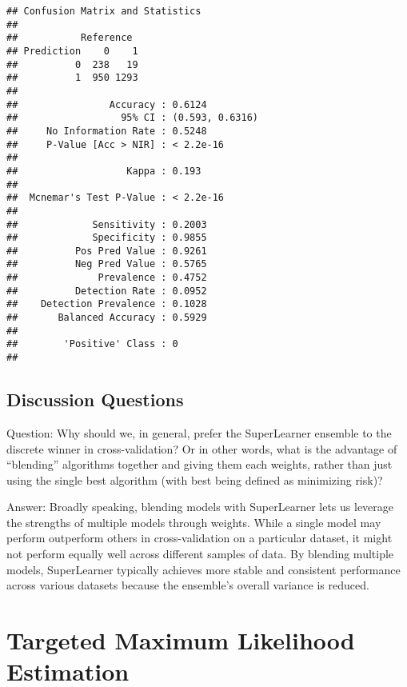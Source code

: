 \documentclass[
]{article}
\begin{document}
\begin{verbatim}
## Confusion Matrix and Statistics
## 
##           Reference
## Prediction    0    1
##          0  238   19
##          1  950 1293
##                                          
##                Accuracy : 0.6124         
##                  95% CI : (0.593, 0.6316)
##     No Information Rate : 0.5248         
##     P-Value [Acc > NIR] : < 2.2e-16      
##                                          
##                   Kappa : 0.193          
##                                          
##  Mcnemar's Test P-Value : < 2.2e-16      
##                                          
##             Sensitivity : 0.2003         
##             Specificity : 0.9855         
##          Pos Pred Value : 0.9261         
##          Neg Pred Value : 0.5765         
##              Prevalence : 0.4752         
##          Detection Rate : 0.0952         
##    Detection Prevalence : 0.1028         
##       Balanced Accuracy : 0.5929         
##                                          
##        'Positive' Class : 0              
## 
\end{verbatim}

\hypertarget{discussion-questions}{%
\subsection{Discussion Questions}\label{discussion-questions}}

Question: Why should we, in general, prefer the SuperLearner ensemble to
the discrete winner in cross-validation? Or in other words, what is the
advantage of ``blending'' algorithms together and giving them each
weights, rather than just using the single best algorithm (with best
being defined as minimizing risk)?

Answer: Broadly speaking, blending models with SuperLearner lets us
leverage the strengths of multiple models through weights. While a
single model may perform outperform others in cross-validation on a
particular dataset, it might not perform equally well across different
samples of data. By blending multiple models, SuperLearner typically
achieves more stable and consistent performance across various datasets
because the ensemble's overall variance is reduced.

\hypertarget{targeted-maximum-likelihood-estimation}{%
\section{Targeted Maximum Likelihood
Estimation}\label{targeted-maximum-likelihood-estimation}}
\end{document}
